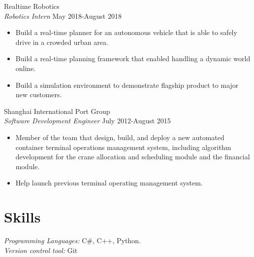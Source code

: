 \documentclass[margin, 10pt]{res} %
\begin{document}
\begin{resume}
{\sc Realtime Robotics}\\
{\sl Robotics Intern} \hfill May 2018-August 2018
\begin{itemize}
\item Build a real-time planner for an autonomous vehicle that is
		able to safely drive in a crowded urban area.
\item Build a real-time planning framework that enabled handling a 
		dynamic world online.
\item Build a simulation environment to demonstrate flagship product
		to major new customers.
\end{itemize}

{\sc Shanghai International Port Group}\\
{\sl Software Development Engineer} \hfill July 2012-August 2015
\begin{itemize}
\item Member of the team that design, build, and deploy a new
  automated container terminal operations management system, including
  algorithm development for the  crane allocation and scheduling
  module and the financial module.
\item Help launch previous terminal operating management system. 
\end{itemize}


\section{Skills} 

{\sl Programming Languages:} C$\#$, C++, Python. \\
{\sl Version control tool:} Git





\end{resume}
\end{document}
